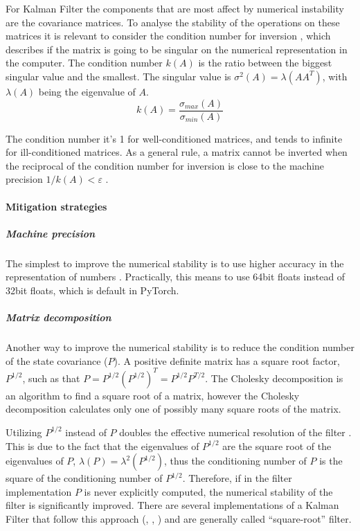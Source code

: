 \documentclass{article}
\begin{document}
For Kalman Filter the components that are most affect by numerical instability are the covariance matrices. To analyse the stability of the operations on these matrices it is relevant to consider the condition number for inversion \cite{mohinder_s_grewal_kalman_2001, kaminski_discrete_1971}, which describes if the matrix is going to be singular on the numerical representation in the computer. The condition number $k(A)$ is the ratio between the biggest singular value and the smallest. The singular value is $\sigma^2(A) = \lambda(AA^T)$, with  $\lambda(A)$ being the eigenvalue of $A$.
\begin{equation}\label{condition_number}
    k(A) = \frac{\sigma_{max}(A)}{\sigma_{min}(A)}
\end{equation}

The condition number it's 1 for well-conditioned matrices, and tends to infinite for ill-conditioned matrices. As a general rule,  a matrix cannot be inverted when the reciprocal of the condition number for inversion is close to the machine precision $ 1/k(A) < \varepsilon$ \cite{mohinder_s_grewal_kalman_2001}.

\paragraph{Mitigation strategies}

\subparagraph{Machine precision} The simplest to improve the numerical stability is to use higher accuracy in the representation of numbers \cite{dan_simon_optimal_2006}. Practically, this means to use 64bit floats instead of 32bit floats, which is default in PyTorch.

\subparagraph{Matrix decomposition} Another way to improve the numerical stability is to reduce the condition number of the state covariance ($P$). A positive definite matrix has a square root factor, $P^{1/2}$, such as that $P = P^{1/2}(P^{1/2})^T=P^{1/2}P^{T/2}$.
The Cholesky decomposition is an algorithm to find a square root of a matrix, however the Cholesky decomposition calculates only one of possibly many square roots of the matrix.

Utilizing $P^{1/2}$ instead of $P$ doubles the effective numerical resolution of the filter \cite{kaminski_discrete_1971} \cite{dan_simon_optimal_2006} \cite{rutten_square-root_2013}. This is due to the fact that the eigenvalues of $P^{1/2}$ are the square root of the eigenvalues of $P$, $\lambda(P) = \lambda^2(P^{1/2})$, thus the conditioning number of $P$ is the square of the conditioning number of $P^{1/2}$. Therefore, if in the filter implementation $P$ is never explicitly computed, the numerical stability of the filter is significantly improved.
There are several implementations of a Kalman Filter that follow this approach (\cite{potter_statistical_1963}, \cite{carlson_fast_1973}, \cite{bierman_numerical_1977}) and are generally called ``square-root'' filter.
\end{document}
